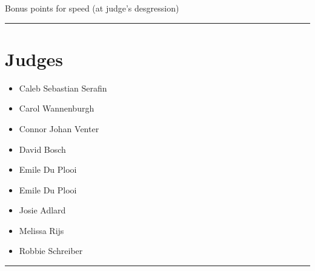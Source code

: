 \documentclass[10pt]{article}
\begin{document}
Bonus points for speed (at judge's desgression)
\vspace{0.5cm}
	\hrule
	\vspace{0.5cm}
		\section*{\faUsers \: Judges}

		

	\begin{multicols}{2}

		\begin{itemize}
									\item Caleb Sebastian Serafin
									\item Carol Wannenburgh
									\item Connor Johan Venter
									\item David Bosch
									\item Emile Du Plooi
						\end{itemize}

		\vfill\null
		\columnbreak

		\begin{itemize}
									\item Emile Du Plooi
									\item Josie Adlard
									\item Melissa Rijs
									\item Robbie Schreiber
						\end{itemize}

		\vfill\null

		\end{multicols}



			\vspace{0.5cm}
	\hrule
	\vspace{0.5cm}
\end{document}

